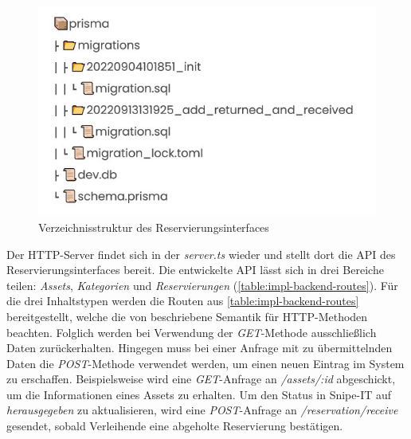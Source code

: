 \begin{figure}[h]
  \centering
  \includegraphics[scale=0.7]{Bilder/Db.jpg}
  \caption[Verzeichnisstruktur des Reservierungsinterfaces]{Verzeichnisstruktur des Reservierungsinterfaces}
  \label{fig:db}
\end{figure}

Der HTTP-Server findet sich in der \textit{server.ts} wieder und stellt dort die API des
Reservierungsinterfaces bereit. Die entwickelte API lässt sich in drei Bereiche teilen:
\textit{Assets}, \textit{Kategorien} und \textit{Reservierungen} (\ref{table:impl-backend-routes}).
Für die drei Inhaltstypen werden die Routen aus \ref{table:impl-backend-routes} bereitgestellt,
welche die von  beschriebene Semantik für HTTP-Methoden beachten.
Folglich werden bei Verwendung der \textit{GET}-Methode ausschließlich Daten zurückerhalten.
Hingegen muss bei einer Anfrage mit zu übermittelnden Daten die \textit{POST}-Methode verwendet
werden, um einen neuen Eintrag im System zu erschaffen. Beispielsweise wird eine
\textit{GET}-Anfrage an \textit{/assets/:id} abgeschickt, um die Informationen eines Assets zu
erhalten. Um den Status in Snipe-IT auf \textit{herausgegeben} zu aktualisieren, wird eine
\textit{POST}-Anfrage an \textit{/reservation/receive} gesendet, sobald Verleihende eine abgeholte
Reservierung bestätigen.

